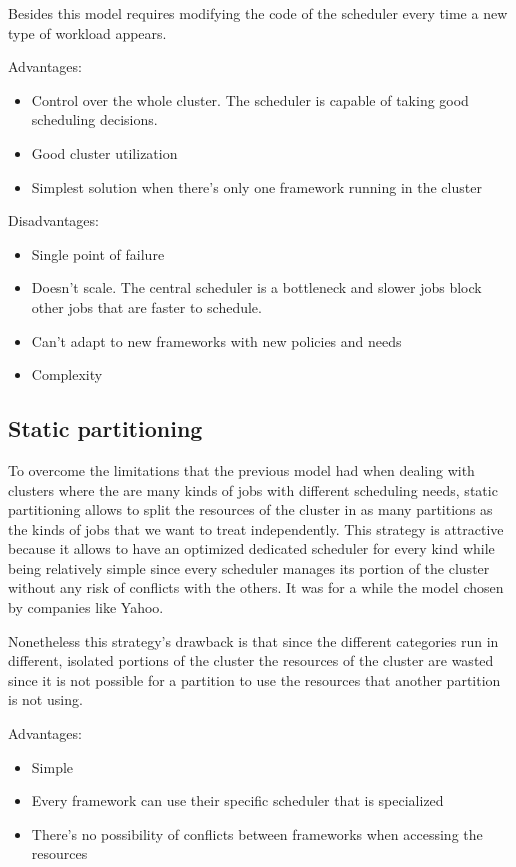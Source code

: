 \documentclass{svjour3}                     %
\begin{document}
Besides this model requires modifying the code of the scheduler every
time a new type of workload appears. 

Advantages:

\begin{itemize}
  \item Control over the whole cluster. The scheduler is capable of taking good scheduling decisions.
  \item Good cluster utilization
  \item Simplest solution when there's only one framework running in the cluster
\end{itemize}

Disadvantages:

\begin{itemize}
  \item Single point of failure
  \item Doesn't scale. The central scheduler is a bottleneck and
    slower jobs block other jobs that are faster to schedule.
  \item Can't adapt to new frameworks with new policies and needs
  \item Complexity
\end{itemize}

\subsection{Static partitioning}

To overcome the limitations that the previous model had when dealing
with clusters where the are many kinds of jobs with different scheduling
needs, static partitioning allows to split the resources of the cluster
in as many partitions as the kinds of jobs that we want to
treat independently. This strategy is attractive because it allows to
have an optimized dedicated scheduler for every kind while being
relatively simple since every scheduler manages its portion of the
cluster without any risk of conflicts with the others. It was
for a while the model chosen by companies like Yahoo.

Nonetheless this strategy's drawback is that since the different 
categories run in different, isolated portions of the cluster the
resources of the cluster are wasted since it is not possible for
a partition to use the resources that another partition is not using.

Advantages:

\begin{itemize}
    \item Simple
    \item Every framework can use their specific scheduler that is specialized
    \item There's no possibility of conflicts between frameworks when
      accessing the resources
\end{itemize}
\end{document}
